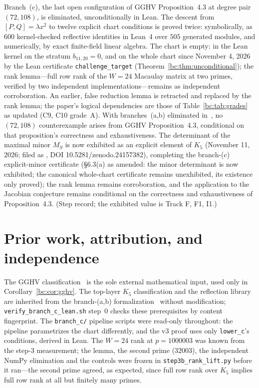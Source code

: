 \documentclass[a4paper,11pt]{article}
\newcommand{\filename}[1]{\texttt{\seqsplit{#1}}}
\theoremstyle{plain}
\theoremstyle{definition}
\theoremstyle{remark}
\begin{document}
Branch~(c), the last open configuration of GGHV Proposition~4.3 at degree pair $(72,108)$, is eliminated, unconditionally in Lean. The descent from $[P,Q]=\lambda x^2$ to twelve explicit chart conditions is proved twice: symbolically, as $600$ kernel-checked reflective identities in Lean~4 over $505$ generated modules, and numerically, by exact finite-field linear algebra. The chart is empty: in the Lean kernel on the stratum $b_{11,20}=0$, and on the whole chart since November 4, 2026 by the Lean certificate \texttt{challenge\_target} (Theorem~\ref{bc:thm:unconditional}); the rank lemma---full row rank of the $W=24$ Macaulay matrix at two primes, verified by two independent implementations---remains as independent corroboration. An earlier, false reduction lemma is retracted and replaced by the rank lemma; the paper's logical dependencies are those of Table~\ref{bc:tab:grades} as updated (C9, C10 grade~A). With branches~(a,b) eliminated in~\cite{BranchABv19}, no $(72,108)$ counterexample arises from GGHV Proposition~4.3, conditional on that proposition's correctness and exhaustiveness. The determinant of the maximal minor $M_S$ is now exhibited as an explicit element of $K_5$ (November 11, 2026; filed as \filename{gghv-dependency-closure/leg9/result.json}, DOI 10.5281/zenodo.24157382), completing the branch-(c) explicit-minor certificate (\S6.3(a) as amended: the minor determinant is now exhibited; the canonical whole-chart certificate remains unexhibited, its existence only proved); the rank lemma remains corroboration, and the application to the Jacobian conjecture remains conditional on the correctness and exhaustiveness of Proposition~4.3. (Step record; the exhibited value is Track F, F1, I1.)

\section{Prior work, attribution, and independence}\label{bc:sec:attribution}

The GGHV classification~\cite{GGHV} is the sole external mathematical input, used only in Corollary~\ref{bc:cor:gghv}. The top-layer $K_5$ classification and the reflection library are inherited from the branch-(a,b) formalization~\cite{BranchABv19} without modification; \texttt{verify\_branch\_c\_lean.sh} step~0 checks these prerequisites by content fingerprint. The \texttt{branch\_c/} pipeline scripts were read-only throughout: the pipeline parametrizes the chart differently, and the v3 proof uses only \texttt{lower\_c}'s conditions, derived in Lean. The $W=24$ rank at $p=1000003$ was known from the step-3 measurement; the lemma, the second prime ($32003$), the independent NumPy elimination and the controls were frozen in \texttt{step3b\_rank\_lift.py} before it ran---the second prime agreed, as expected, since full row rank over $K_5$ implies full row rank at all but finitely many primes.
\end{document}
